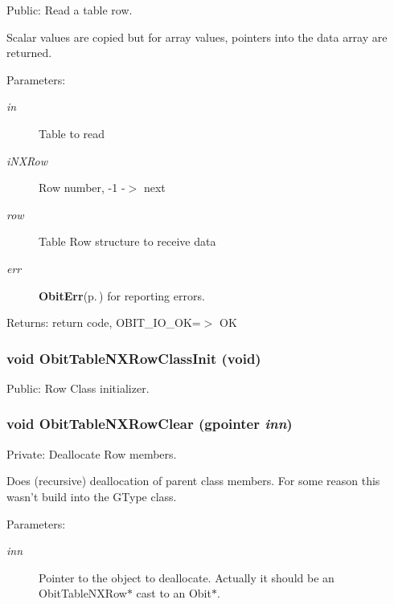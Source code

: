 Public: Read a table row. 

Scalar values are copied but for array values, pointers into the data array are returned. \begin{Desc}
\item[Parameters:]
\begin{description}
\item[{\em in}]Table to read \item[{\em i\-NXRow}]Row number, -1 -$>$ next \item[{\em row}]Table Row structure to receive data \item[{\em err}]{\bf Obit\-Err}{\rm (p.\,\pageref{structObitErr})} for reporting errors. \end{description}
\end{Desc}
\begin{Desc}
\item[Returns:]return code, OBIT\_\-IO\_\-OK=$>$ OK \end{Desc}
\subsubsection{\setlength{\rightskip}{0pt plus 5cm}void Obit\-Table\-NXRow\-Class\-Init (void)}\label{ObitTableNX_8c_a26}


Public: Row Class initializer. 

\subsubsection{\setlength{\rightskip}{0pt plus 5cm}void Obit\-Table\-NXRow\-Clear (gpointer {\em inn})}\label{ObitTableNX_8c_a7}


Private: Deallocate Row members. 

Does (recursive) deallocation of parent class members. For some reason this wasn't build into the GType class. \begin{Desc}
\item[Parameters:]
\begin{description}
\item[{\em inn}]Pointer to the object to deallocate. Actually it should be an Obit\-Table\-NXRow$\ast$ cast to an Obit$\ast$. \end{description}
\end{Desc}
